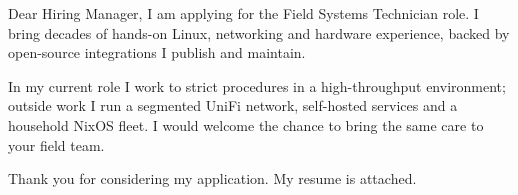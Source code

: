 \documentclass[cover]{jupiter-letter}
\begin{document}
\begin{jpletter}{Dear Hiring Manager,}
I am applying for the Field Systems Technician role. I bring decades of hands-on Linux, networking and hardware experience, backed by open-source integrations I publish and maintain.

In my current role I work to strict procedures in a high-throughput environment; outside work I run a segmented UniFi network, self-hosted services and a household NixOS fleet. I would welcome the chance to bring the same care to your field team.

Thank you for considering my application. My resume is attached.
\end{jpletter}
\end{document}
